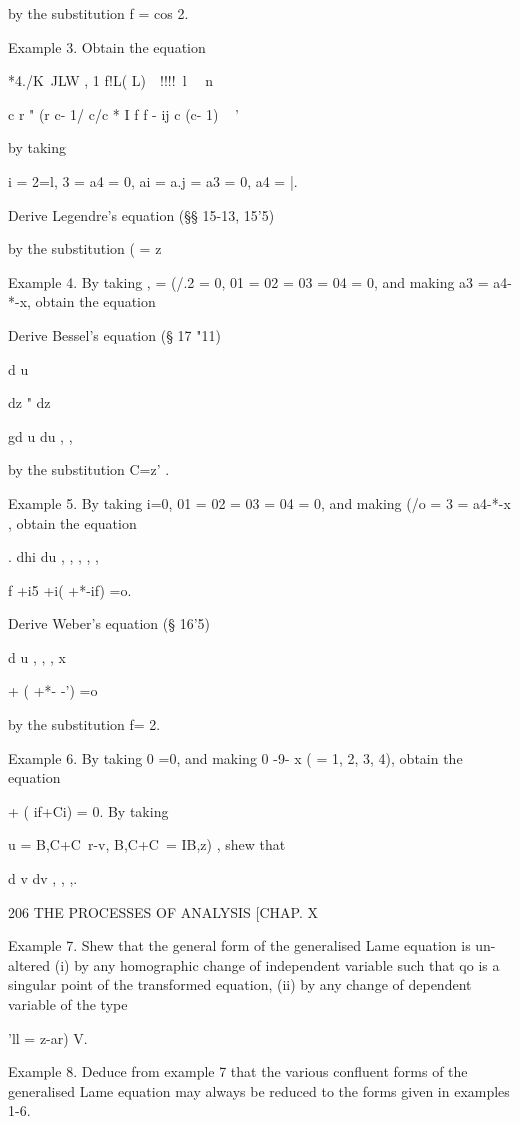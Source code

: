 by the substitution f = cos 2.

Example 3. Obtain the equation

 *4./K\ JLW , 1 f!L( L)\ \ !!!!\ l \ \ n

c r " (r c- 1/ c/c * I f f - ij c (c- 1) ~ '

by taking

 i = 2=l, 3 = a4 = 0, ai = a.j = a3 = 0, a4 = |.

Derive Legendre's equation (§§ 15-13, 15'5)

by the substitution ( = z~\

Example 4. By taking , = (/.2 = 0, 01 = 02 = 03 = 04 = 0, and making
a3 = a4-*-x, obtain the equation



Derive Bessel's equation (§ 17 "11)

d u

dz " dz



gd u du , ,



by the substitution C=z' .

Example 5. By taking i=0, 01 = 02 = 03 = 04 = 0, and making (/o = 3 =
a4-*-x , obtain the equation

. dhi du , , , , ,

f +i5 +i( +*-if) =o.

Derive Weber's equation (§ 16'5)

d u , , , x

  + ( +*- -') =o

by the substitution f= 2.

Example 6. By taking 0 =0, and making 0 -9- x ( = 1, 2, 3, 4), obtain
the equation

  + ( if+Ci) = 0. By taking

u = B,C+C\ r-v, B,C+C\ = IB,z) , shew that

 d v dv , , ,.



206 THE PROCESSES OF ANALYSIS [CHAP. X

Example 7. Shew that the general form of the generalised Lame equation
is un- altered (i) by any homographic change of independent variable
such that qo is a singular point of the transformed equation, (ii) by
any change of dependent variable of the type

'll = z-ar) V.

Example 8. Deduce from example 7 that the various confluent forms of
the generalised Lame equation may always be reduced to the forms given
in examples 1-6.

